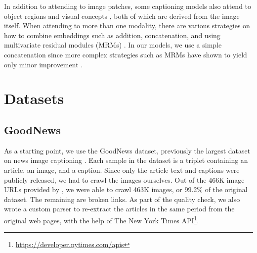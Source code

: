 \documentclass[10pt,twocolumn,letterpaper]{article}
\begin{document}
In addition to attending to image patches, some captioning models also attend
to object regions \cite{Wang2019Hierarchical} and visual concepts
\cite{You2016ImageCW,Li2019Boosted,Wang2019Hierarchical}, both of which are
derived from the image itself. When attending to more than one modality, there
are various strategies on how to combine embeddings such as addition,
concatenation, and using multivariate residual modules (MRMs)
\cite{Kim2016MultimodalRL}. In our models, we use a simple concatenation since
more complex strategies such as MRMs have shown to yield only minor improvement
\cite{Wang2019Hierarchical}.



\section{Datasets}

\subsection{GoodNews}

As a starting point, we use the GoodNews dataset, previously the largest
dataset on news image captioning \cite{Biten2019GoodNews}. Each sample in the
dataset is a triplet containing an article, an image, and a caption. Since only
the article text and captions were publicly released, we had to crawl the
images ourselves. Out of the 466K image URLs provided by
\cite{Biten2019GoodNews}, we were able to crawl 463K images, or 99.2\% of the
original dataset. The remaining are broken links. As part of the quality check,
we also wrote a custom parser to re-extract the articles in the same period
from the original web pages, with the help of The New York Times
API\footnote{\href{https://developer.nytimes.com/apis}{https://developer.nytimes.com/apis}}.

\end{document}
